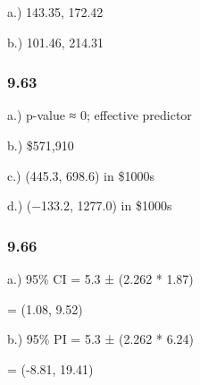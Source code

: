 \documentclass[
]{article}
\begin{document}
a.) 143.35, 172.42

b.) 101.46, 214.31

\hypertarget{section-12}{%
\subsubsection{9.63}\label{section-12}}

a.) p-value ≈ 0; effective predictor

b.) \$571,910

c.) (445.3, 698.6) in \$1000s

d.) (−133.2, 1277.0) in \$1000s

\hypertarget{section-13}{%
\subsubsection{9.66}\label{section-13}}

a.) 95\% CI = 5.3 ± (2.262 * 1.87)

= (1.08, 9.52)

b.) 95\% PI = 5.3 ± (2.262 * 6.24)

= (-8.81, 19.41)
\end{document}
